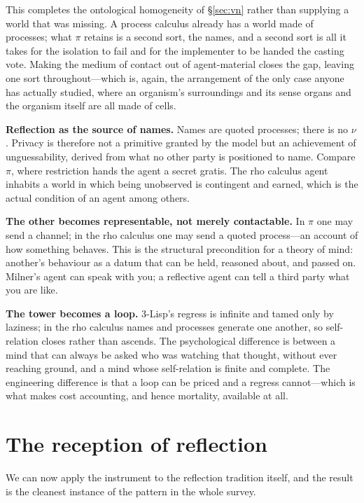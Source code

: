 \documentclass[11pt,a4paper]{article}
\newcommand{\rhoc}{rho calculus}
\begin{document}
This completes the ontological homogeneity of \S\ref{sec:vn} rather than supplying
a world that was missing. A process calculus already has a world made of
processes; what $\pi$ retains is a second sort, the names, and a second sort is
all it takes for the isolation to fail and for the implementer to be handed the
casting vote. Making the medium of contact out of agent-material closes the gap,
leaving one sort throughout---which is, again, the arrangement of the only case
anyone has actually studied, where an organism's surroundings and its sense organs
and the organism itself are all made of cells.

\textbf{Reflection as the source of names.} Names are quoted processes; there is no
$\nu$. Privacy is therefore not a primitive granted by the model but an achievement
of unguessability, derived from what no other party is positioned to name. Compare
$\pi$, where restriction hands the agent a secret gratis. The \rhoc{} agent
inhabits a world in which being unobserved is contingent and earned, which is the
actual condition of an agent among others.

\textbf{The other becomes representable, not merely contactable.} In $\pi$ one may
send a channel; in the \rhoc{} one may send a quoted process---an account of how
something behaves. This is the structural precondition for a theory of mind:
another's behaviour as a datum that can be held, reasoned about, and passed on.
Milner's agent can speak with you; a reflective agent can tell a third party what
you are like.

\textbf{The tower becomes a loop.} 3-Lisp's regress is infinite and tamed only by
laziness; in the \rhoc{} names and processes generate one another, so self-relation
closes rather than ascends. The psychological difference is between a mind that can
always be asked who was watching that thought, without ever reaching ground, and a
mind whose self-relation is finite and complete. The engineering difference is that
a loop can be priced and a regress cannot---which is what makes cost accounting,
and hence mortality, available at all.

\section{The reception of reflection}

We can now apply the instrument to the reflection tradition itself, and the result
is the cleanest instance of the pattern in the whole survey.
\end{document}
